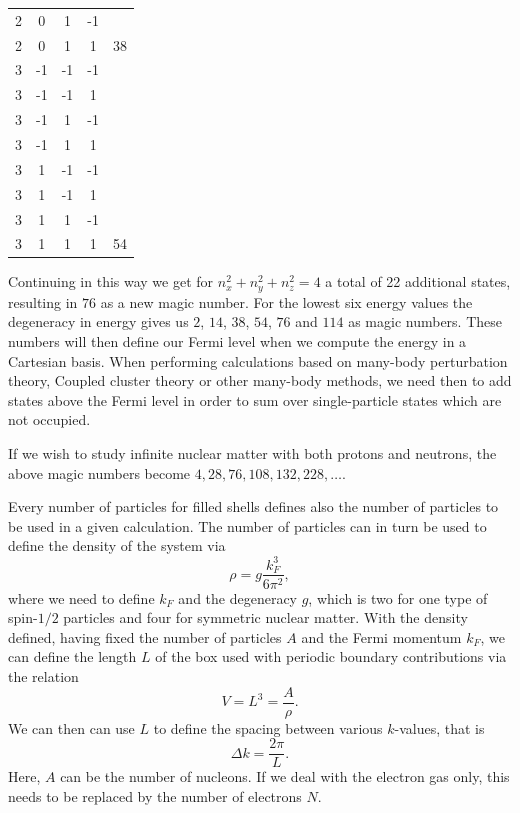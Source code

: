 \begin{center}
\begin{tabular}{ccccc}
2                               & 0       & 1       & -1      &                            \\
2                               & 0       & 1       & 1       & 38                         \\
\hline
3                               & -1      & -1      & -1      &                            \\
3                               & -1      & -1      & 1       &                            \\
3                               & -1      & 1       & -1      &                            \\
3                               & -1      & 1       & 1       &                            \\
3                               & 1       & -1      & -1      &                            \\
3                               & 1       & -1      & 1       &                            \\
3                               & 1       & 1       & -1      &                            \\
3                               & 1       & 1       & 1       & 54                         \\
\hline
\end{tabular}
\end{center}


Continuing in this way we get for $n_{x}^{2}+n_{y}^{2}+n_{z}^{2}=4$ a
total of 22 additional states, resulting in $76$ as a new magic
number. For the lowest six energy values the degeneracy in energy
gives us $2$, $14$, $38$, $54$, $76$ and $114$ as magic numbers. These
numbers will then define our Fermi level when we compute the energy in
a Cartesian basis. When performing calculations based on many-body
perturbation theory, Coupled cluster theory or other many-body
methods, we need then to add states above the Fermi level in order to
sum over single-particle states which are not occupied.

If we wish to study infinite nuclear matter with both protons and
neutrons, the above magic numbers become $4, 28, 76, 108, 132, 228, \dots$.

Every number of particles for filled shells defines also the number of
particles to be used in a given calculation. The number of
particles can in turn be used to define the density of the system via
\[
\rho = g \frac{k_F^3}{6\pi^2},
\]
where we need to define $k_F$ and the degeneracy $g$, which is two
for one type of spin-$1/2$ particles and four for symmetric nuclear
matter.  With the density defined, having fixed the number of particles $A$ and the Fermi momentum $k_F$,
we can define the length $L$ of the box used with periodic
boundary contributions via the relation
\[
  V= L^3= \frac{A}{\rho}.
\]
We can then  can use $L$ to define the spacing between
various $k$-values, that is
\[
  \Delta k = \frac{2\pi}{L}.
\]
Here, $A$ can be the number of nucleons. If we deal with the electron
gas only, this needs to be replaced by the number of electrons $N$.



